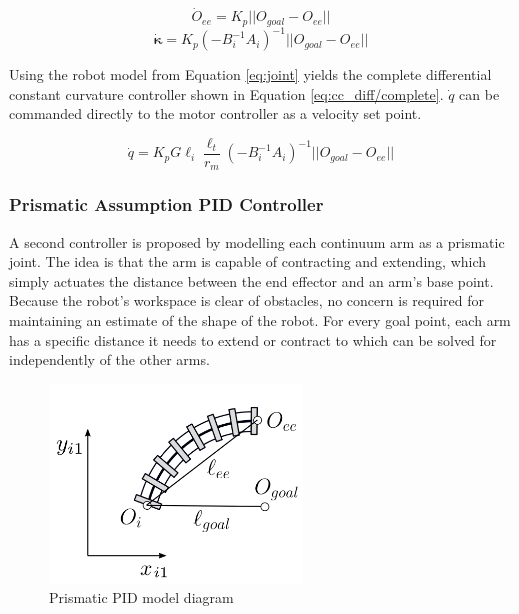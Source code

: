 \begin{equation}\label{eq:cc_diff/gain}
     \dot O_{ee} = K_p|| O_{goal} - O_{ee} ||
\end{equation}
\begin{equation}\label{eq:cc_diff/gain_ik}
     \mathbf{\dot{\kappa}} = K_p(-B^{-1}_iA_i)^{-1} || O_{goal} - O_{ee} ||
\end{equation}

Using the robot model from Equation \eqref{eq:joint} yields the complete differential constant curvature controller shown in Equation \eqref{eq:cc_diff/complete}. $\dot q$ can be commanded directly to the motor controller as a velocity set point. 

\begin{equation}\label{eq:cc_diff/complete}
     \dot q = K_pG \ell_i \frac{\ell_t}{r_m}(-B^{-1}_iA_i)^{-1} || O_{goal} - O_{ee} ||
\end{equation}

\subsubsection{Prismatic Assumption PID Controller}

A second controller is proposed by modelling each continuum arm as a prismatic joint. The idea is that the arm is capable of contracting and extending, which simply actuates the distance between the end effector and an arm's base point. Because the robot's workspace is clear of obstacles, no concern is required for maintaining an estimate of the shape of the robot. For every goal point, each arm has a specific distance it needs to extend or contract to which can be solved for independently of the other arms. 

\begin{figure}[H]
    \centering
    \includegraphics[width=0.6\textwidth]{images/pid_controller.png}
    \caption{Prismatic PID model diagram}
    \label{fig:pid_controller}
\end{figure}

